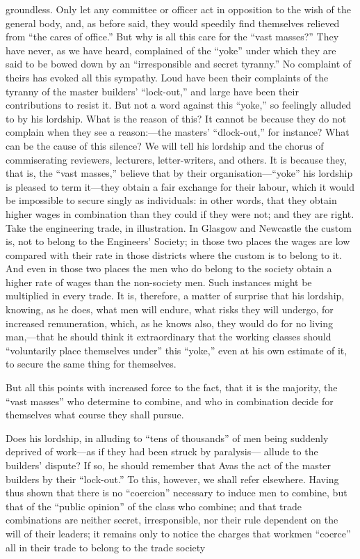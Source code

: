 groundless. Only let any committee or officer act in opposition to the
wish of the general body, and, as before said, they would speedily find
themselves relieved from ``the cares of office.'' But why is all this
care for the ``vast masses?'' They have never, as we have heard,
complained of the ``yoke'' under which they are said to be bowed down by
an ``irresponsible and secret tyranny.'' No complaint of theirs has
evoked all this sympathy. Loud have been their complaints of the tyranny
of the master builders' ``lock-out,'' and large have been their
contributions to resist it. But not a word against this ``yoke,'' so
feelingly alluded to by his lordship. What is the reason of this? It
cannot be because they do not complain when they see a reason:---the
masters' ``dlock-out,'' for instance? What can be the cause of this
silence? We will tell his lordship and the chorus of commiserating
reviewers, lecturers, letter-writers, and others. It is because they,
that is, the ``vast masses,'' believe that by their organisation---``yoke''
his lordship is pleased to term it---they obtain a fair exchange for their
labour, which it would be impossible to secure singly as individuals:
in other words, that they obtain higher wages in combination than they
could if they were not; and they are right. Take the engineering trade,
in illustration. In Glasgow and Newcastle the custom is, not to belong
to the Engineers' Society; in those two places the wages are low
compared with their rate in those districts where the custom is to
belong to it. And even in those two places the men who do belong to the
society obtain a higher rate of wages than the non-society men. Such
instances might be multiplied in every trade. It is, therefore, a matter
of surprise that his lordship, knowing, as he does, what men will
endure, what risks they will undergo, for increased remuneration, which,
as he knows also, they would do for no living man,---that he should think
it extraordinary that the working classes should ``voluntarily place
themselves under'' this ``yoke,'' even at his own estimate of it, to
secure the same thing for themselves.

But all this points with increased force to the fact, that it is the
majority, the ``vast masses'' who determine to combine, and who in
combination decide for themselves what course they shall pursue.

Does his lordship, in alluding to ``tens of thousands'' of men being
suddenly deprived of work---as if they had been struck by paralysis---
allude to the builders' dispute? If so, he should remember that Avas the
act of the master builders by their ``lock-out.'' To this, however, we
shall refer elsewhere. Having thus shown that there is no ``coercion''
necessary to induce men to combine, but that of the ``public opinion'' of
the class who combine; and that trade combinations are neither secret,
irresponsible, nor their rule dependent on the will of their leaders; it
remains only to notice the charges that workmen ``coerce'' all in their
trade to belong to the trade society

